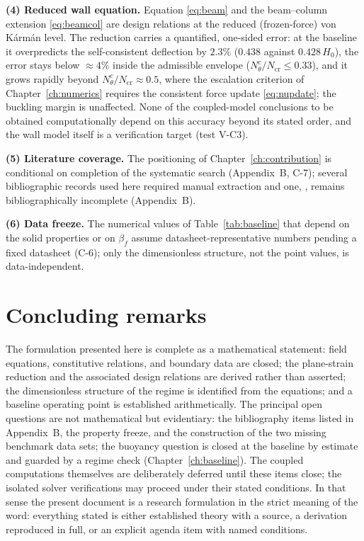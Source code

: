 \textbf{(4) Reduced wall equation.} Equation \eqref{eq:beam} and the beam--column extension
\eqref{eq:beamcol} are design relations at the reduced (frozen-force) von K\'arm\'an level. The
reduction carries a quantified, one-sided error: at the baseline it overpredicts the
self-consistent deflection by $2.3\%$ ($0.438$ against $0.428\,H_0$), the error stays below
$\approx4\%$ inside the admissible envelope ($N_\theta^c/N_{\mathrm{cr}}\le0.33$), and it grows
rapidly beyond $N_\theta^c/N_{\mathrm{cr}}\approx0.5$, where the escalation criterion of
Chapter~\ref{ch:numerics} requires the consistent force update \eqref{eq:nupdate}; the buckling
margin is unaffected. None of the coupled-model conclusions to be obtained computationally
depend on this accuracy beyond its stated order, and the wall model itself is a verification
target (test V-C3).

\textbf{(5) Literature coverage.} The positioning of Chapter~\ref{ch:contribution} is conditional
on completion of the systematic search (Appendix~B, C-7); several bibliographic records used here
required manual extraction and one, \cite{gupta2024photothermo}, remains bibliographically
incomplete (Appendix~B).

\textbf{(6) Data freeze.} The numerical values of Table~\ref{tab:baseline} that depend on the solid
properties or on $\beta_f$ assume datasheet-representative numbers pending a fixed datasheet
(C-6); only the dimensionless structure, not the point values, is data-independent.

\section{Concluding remarks}
The formulation presented here is complete as a mathematical statement: field equations,
constitutive relations, and boundary data are closed; the plane-strain reduction and the associated
design relations are derived rather than asserted; the dimensionless structure of the regime is
identified from the equations; and a baseline operating point is established arithmetically. The
principal open questions are not mathematical but evidentiary: the bibliography items listed in
Appendix~B, the property freeze, and the construction of the two missing benchmark data sets; the
buoyancy question is closed at the baseline by estimate and guarded by a regime check
(Chapter~\ref{ch:baseline}). The coupled computations themselves are deliberately deferred until these
items close; the isolated solver verifications may proceed under their stated conditions. In that
sense the present document is a research formulation in the strict meaning of the word: everything
stated is either established theory with a source, a derivation reproduced in full, or an explicit
agenda item with named conditions.
